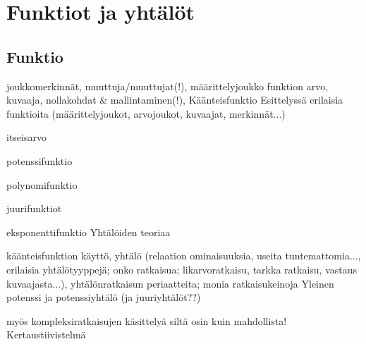 %
\part{Funktiot ja yhtälöt}
%
%
\chapter{Funktio}

joukkomerkinnät, muuttuja/muuttujat(!), määrittelyjoukko funktion arvo, kuvaaja, nollakohdat \& mallintaminen(!), Käänteisfunktio
Esittelyssä erilaisia funktioita (määrittelyjoukot, arvojoukot, kuvaajat, merkinnät...)

itseisarvo

potenssifunktio

polynomifunktio

juurifunktiot

eksponenttifunktio
Yhtälöiden teoriaa

käänteisfunktion käyttö, yhtälö (relaation ominaisuuksia, useita tuntemattomia...,     erilaisia yhtälötyyppejä; onko ratkaisua; likarvoratkaisu, tarkka ratkaisu, vastaus     kuvaajasta...), yhtälönratkaisun periaatteita; monia ratkaisukeinoja
Yleinen potenssi ja potenssiyhtälö (ja juuriyhtälöt??)

myös kompleksiratkaisujen käsittelyä siltä osin kuin mahdollista!
Kertaustiivistelmä